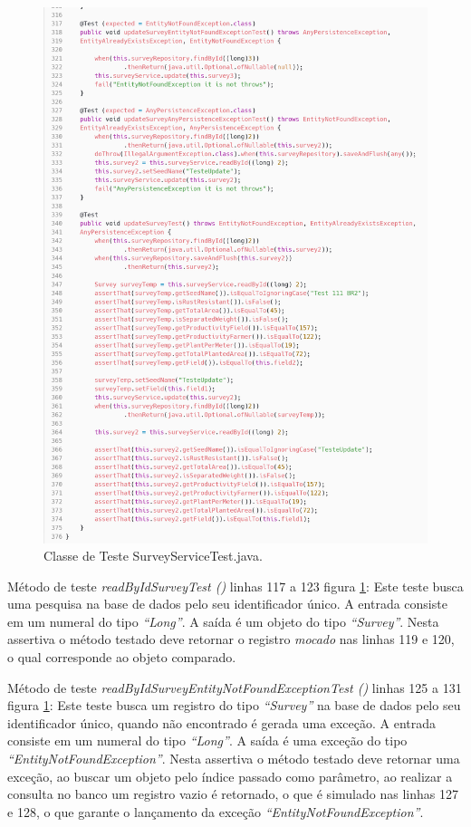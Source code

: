 \begin{figure}[H]
	\centering
	\includegraphics[scale=0.27]{dados/figuras/carbonSurveyService3.png}
	\caption{Classe de Teste  SurveyServiceTest.java.}
	\label{testeSurveyService}
\end{figure}

Método de teste \textit{ readByIdSurveyTest ()} linhas 117 a 123 figura \ref{testeSurveyService}: Este teste busca uma pesquisa na base de dados pelo seu identificador único. A entrada consiste em um numeral do tipo \textit{“Long”}. A saída é um objeto do tipo \textit{“Survey”}. Nesta assertiva o método testado deve retornar o registro \textit{mocado} nas linhas 119 e 120, o qual corresponde ao objeto comparado.

Método de teste \textit{ readByIdSurveyEntityNotFoundExceptionTest ()} linhas 125 a 131 figura \ref{testeSurveyService}: Este teste busca um registro do tipo \textit{“Survey”} na base de dados pelo seu identificador único, quando não encontrado é gerada uma exceção. A entrada consiste em um numeral do tipo \textit{“Long”}. A saída é uma exceção do tipo \textit{“EntityNotFoundException”}. Nesta assertiva o método testado deve retornar uma exceção, ao buscar um objeto pelo índice passado como parâmetro, ao realizar a consulta no banco um registro vazio é retornado, o que é simulado nas linhas 127 e 128, o que garante o lançamento da exceção \textit{“EntityNotFoundException”}.

